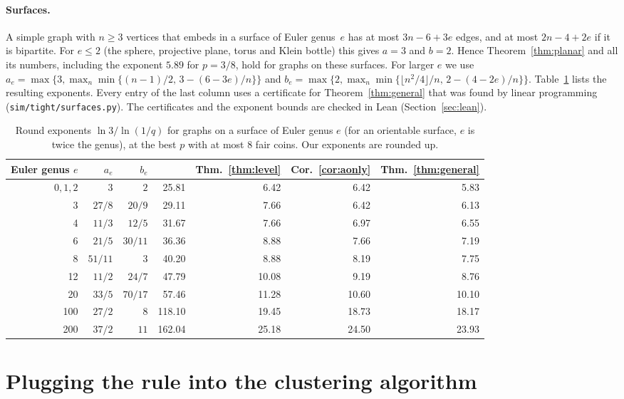 \documentclass[11pt]{article}
\theoremstyle{remark}
\begin{document}
\paragraph{Surfaces.} A simple graph with $n\ge3$ vertices that embeds in a surface of Euler
genus~$e$ has at most $3n-6+3e$ edges, and at most $2n-4+2e$ if it is bipartite. For $e\le2$ (the
sphere, projective plane, torus and Klein bottle) this gives $a=3$ and $b=2$. Hence
Theorem~\ref{thm:planar} and all its numbers, including the exponent $5.89$ for $p=3/8$, hold for
graphs on these surfaces. For larger $e$ we use
$a_e=\max\{3,\max_n\min\{(n-1)/2,\,3-(6-3e)/n\}\}$ and
$b_e=\max\{2,\max_n\min\{\lfloor n^2/4\rfloor/n,\,2-(4-2e)/n\}\}$. Table~\ref{tab:surfaces} lists
the resulting exponents. Every entry of the last column uses a certificate for
Theorem~\ref{thm:general} that was found by linear programming (\texttt{sim/tight/surfaces.py}). The
certificates and the exponent bounds are checked in Lean (Section~\ref{sec:lean}).

\begin{table}[ht]\centering
\begin{tabular}{rrr|rrrr}\toprule
Euler genus $e$ & $a_e$ & $b_e$ & \cite{AS26} & Thm.~\ref{thm:level} & Cor.~\ref{cor:aonly} &
Thm.~\ref{thm:general}\\\midrule
$0,1,2$ & $3$ & $2$ & 25.81 & 6.42 & 6.42 & 5.83\\
3 & $27/8$ & $20/9$ & 29.11 & 7.66 & 6.42 & 6.13\\
4 & $11/3$ & $12/5$ & 31.67 & 7.66 & 6.97 & 6.55\\
6 & $21/5$ & $30/11$ & 36.36 & 8.88 & 7.66 & 7.19\\
8 & $51/11$ & $3$ & 40.20 & 8.88 & 8.19 & 7.75\\
12 & $11/2$ & $24/7$ & 47.79 & 10.08 & 9.19 & 8.76\\
20 & $33/5$ & $70/17$ & 57.46 & 11.28 & 10.60 & 10.10\\
100 & $27/2$ & $8$ & 118.10 & 19.45 & 18.73 & 18.17\\
200 & $37/2$ & $11$ & 162.04 & 25.18 & 24.50 & 23.93\\\bottomrule
\end{tabular}
\caption{Round exponents $\ln3/\ln(1/q)$ for graphs on a surface of Euler genus $e$ (for an
orientable surface, $e$ is twice the genus), at the best $p$ with at most $8$ fair coins. Our
exponents are rounded up.}
\label{tab:surfaces}
\end{table}

\section{Plugging the rule into the clustering algorithm}\label{sec:integration}
\end{document}
